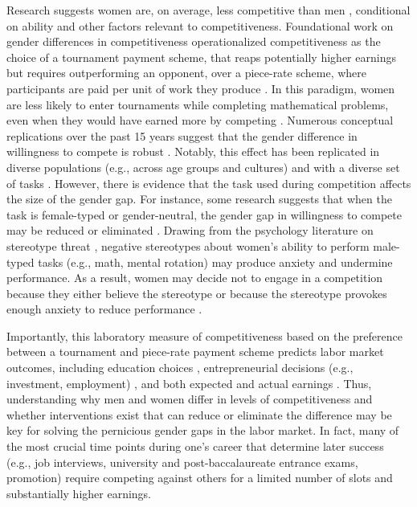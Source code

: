 \documentclass[letterpaper, nobind]{templates/ociamthesis}
\begin{document}
Research suggests women are, on average, less competitive than men \autocites[for review, see][]{Niederle2011,Croson2009,Niederle2017b,Shurchkov2018}, conditional on ability and other factors relevant to competitiveness. Foundational work on gender differences in competitiveness operationalized competitiveness as the choice of a tournament payment scheme, that reaps potentially higher earnings but requires outperforming an opponent, over a piece-rate scheme, where participants are paid per unit of work they produce \autocites{Niederle2007}[although see][ for an arguably more sensitive test of gender differences in competitiveness]{Saccardo2018}. In this paradigm, women are less likely to enter tournaments while completing mathematical problems, even when they would have earned more by competing \autocite{Niederle2007}. Numerous conceptual replications over the past 15 years suggest that the gender difference in willingness to compete is robust \autocites[see][ for review]{Niederle2011,Niederle2017a,Niederle2017b}. Notably, this effect has been replicated in diverse populations (e.g., across age groups and cultures) \autocite{Apicella2015,Buser2014,Sutter2016,Andersen2013,Buser2017b,Sutter2010,Dreber2014,Mayr2012} and with a diverse set of tasks \autocite{Apicella2015,Saccardo2018,Bjorvatn2016,Sutter2015,Frick2011,Samek2019}. However, there is evidence that the task used during competition affects the size of the gender gap. For instance, some research suggests that when the task is female-typed or gender-neutral, the gender gap in willingness to compete may be reduced or eliminated \autocite{Iriberri2017,Boschini2014,Boschini2019,Apicella2015,Grosse2010,Gunther2010,Dreber2014,Dreber2011,Shurchkov2012}. Drawing from the psychology literature on stereotype threat \autocite{Steele1997,Spencer1999,Spencer2016}, negative stereotypes about women's ability to perform male-typed tasks (e.g., math, mental rotation) may produce anxiety and undermine performance. As a result, women may decide not to engage in a competition because they either believe the stereotype or because the stereotype provokes enough anxiety to reduce performance \autocite{Gunther2010,Grosse2010,Iriberri2017,Shurchkov2012}.

Importantly, this laboratory measure of competitiveness based on the preference between a tournament and piece-rate payment scheme predicts labor market outcomes, including education choices \autocite{Buser2014,Zhang2012,Buser2017c,Buser2017b}, entrepreneurial decisions (e.g., investment, employment) \autocite{Berge2015}, and both expected and actual earnings \autocite{Reuben2015,Reuben2017}. Thus, understanding why men and women differ in levels of competitiveness and whether interventions exist that can reduce or eliminate the difference may be key for solving the pernicious gender gaps in the labor market. In fact, many of the most crucial time points during one's career that determine later success (e.g., job interviews, university and post-baccalaureate entrance exams, promotion) require competing against others for a limited number of slots and substantially higher earnings.
\end{document}
